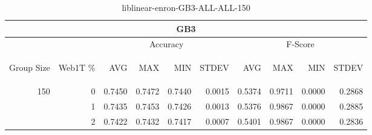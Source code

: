 \begin{center}
\begin{table}[htbp]
\begin{tabular}{ | r | r | r | r | r | r | r | r | r | r |}
\hline
\multicolumn{10}{|c|}{GB3}\\
\hline
 & & \multicolumn{4}{|c|}{Accuracy} & \multicolumn{4}{|c|}{F-Score}\\ \cline{3-10}
\begin{sideways}Group Size\end{sideways} & \begin{sideways}Web1T \%\end{sideways} & \begin{sideways}AVG\end{sideways} & \begin{sideways}MAX\end{sideways} & \begin{sideways}MIN\end{sideways} & \begin{sideways}STDEV\end{sideways} & \begin{sideways}AVG\end{sideways} & \begin{sideways}MAX\end{sideways} & \begin{sideways}MIN\end{sideways} & \begin{sideways}STDEV\end{sideways}\\
\hline
\multirow{3}{*}{150}
 & 0 & 0.7450 & 0.7472 & 0.7440 & 0.0015 & 0.5374 & 0.9711 & 0.0000 & 0.2868\\ \cline{2-10}
 & 1 & 0.7435 & 0.7453 & 0.7426 & 0.0013 & 0.5376 & 0.9867 & 0.0000 & 0.2885\\ \cline{2-10}
 & 2 & 0.7422 & 0.7432 & 0.7417 & 0.0007 & 0.5401 & 0.9867 & 0.0000 & 0.2836\\ \cline{2-10}
\hline
\end{tabular}
\caption{liblinear-enron-GB3-ALL-ALL-150}
\end{table}
\end{center}

